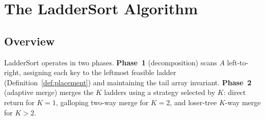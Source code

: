 \documentclass[12pt,a4paper]{article}
\theoremstyle{plain}
\theoremstyle{definition}
\begin{document}
\section{The LadderSort Algorithm}
\label{sec:algorithm}

\subsection{Overview}

LadderSort operates in two phases.
\textbf{Phase~1} (decomposition) scans $A$ left-to-right, assigning each key
to the leftmost feasible ladder (Definition~\ref{def:placement}) and
maintaining the tail array invariant.  \textbf{Phase~2} (adaptive merge)
merges the $K$ ladders using a strategy selected by $K$: direct return for
$K=1$, galloping two-way merge for $K=2$, and loser-tree $K$-way merge
for $K > 2$.
\end{document}
